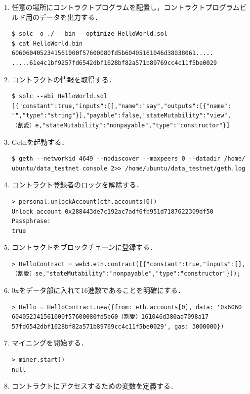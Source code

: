 \begin{enumerate}
\item 任意の場所にコントラクトプログラムを配置し，コントラクトプログラムビルド用のデータを出力する．
\begin{verbatim}
$ solc -o ./ --bin --optimize HelloWorld.sol
$ cat HelloWorld.bin
6060604052341561000f57600080fd5b60405161046d38038061.....
.....61e4c1bf9257fd6542dbf1628bf82a571b89769cc4c11f5be0029
\end{verbatim}
\item コントラクトの情報を取得する．
\begin{verbatim}
$ solc --abi HelloWorld.sol
[{"constant":true,"inputs":[],"name":"say","outputs":[{"name":
"","type":"string"}],"payable":false,"stateMutability":"view",
（割愛）e,"stateMutability":"nonpayable","type":"constructor"}]
\end{verbatim}
\item Gethを起動する．
\begin{verbatim}
$ geth --networkid 4649 --nodiscover --maxpeers 0 --datadir /home/
ubuntu/data_testnet console 2>> /home/ubuntu/data_testnet/geth.log
\end{verbatim}
\item コントラクト登録者のロックを解除する．
\begin{verbatim}
> personal.unlockAccount(eth.accounts[0])
Unlock account 0x288443de7c192ac7adf6fb951d7187622309df50
Passphrase:
true
\end{verbatim}
\item コントラクトをブロックチェーンに登録する．
\begin{verbatim}
> HelloContract = web3.eth.contract([{"constant":true,"inputs":[],
（割愛）se,"stateMutability":"nonpayable","type":"constructor"}]);
\end{verbatim}
\item 0xをデータ部に入れて16進数であることを明確にする．
\begin{verbatim}
> Hello = HelloContract.new({from: eth.accounts[0], data: '0x6060
604052341561000f57600080fd5b60（割愛）161046d380aa7098a17
57fd6542dbf1628bf82a571b89769cc4c11f5be0029', gas: 3000000})
\end{verbatim}
\item マイニングを開始する．
\begin{verbatim}
> miner.start()
null
\end{verbatim}
\newpage
\item コントラクトにアクセスするための変数を定義する．
\begin{verbatim}

\end{verbatim}
\end{enumerate}

